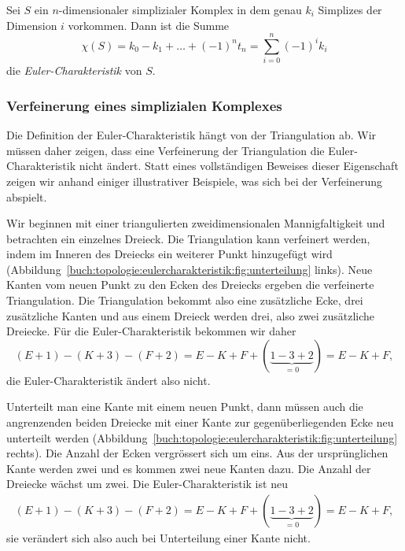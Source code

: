 \begin{definition}
Sei $S$ ein $n$-dimensionaler simplizialer Komplex in dem
genau $k_i$ Simplizes der Dimension $i$ vorkommen.
Dann ist die Summe
\[
\chi(S)
=
k_0 - k_1 + \dots + (-1)^n t_n
=
\sum_{i=0}^n (-1)^i k_i
\]
die \emph{Euler-Charakteristik} von $S$.
%
\end{definition}

%
%
\subsubsection{Verfeinerung eines simplizialen Komplexes}
Die Definition der Euler-Charakteristik hängt von der Triangulation ab.
Wir müssen daher zeigen, dass eine Verfeinerung der Triangulation die
Euler-Charakteristik nicht ändert.
Statt eines vollständigen Beweises dieser Eigenschaft zeigen wir anhand
einiger illustrativer Beispiele, was sich bei der Verfeinerung
abspielt.
%

Wir beginnen mit einer triangulierten zweidimensionalen Mannigfaltigkeit
und betrachten ein einzelnes Dreieck.
Die Triangulation kann verfeinert werden, indem im Inneren des
Dreiecks ein weiterer Punkt hinzugefügt wird
(Abbildung~\ref{buch:topologie:eulercharakteristik:fig:unterteilung} links).
Neue Kanten vom neuen Punkt zu den Ecken des Dreiecks ergeben die
verfeinerte Triangulation.
Die Triangulation bekommt also eine zusätzliche Ecke, drei zusätzliche
Kanten und aus einem Dreieck werden drei, also zwei zusätzliche Dreiecke.
Für die Euler-Charakteristik bekommen wir daher
\[
(E+1) - (K+3) - (F+2)
=
E-K+F+(\underbrace{1-3+2}_{\displaystyle=0})
=
E-K+F,
\]
die Euler-Charakteristik ändert also nicht.

Unterteilt man eine Kante mit einem neuen Punkt, dann müssen auch
die angrenzenden beiden Dreiecke mit einer Kante zur gegenüberliegenden
Ecke neu unterteilt werden
(Abbildung~\ref{buch:topologie:eulercharakteristik:fig:unterteilung} rechts).
Die Anzahl der Ecken vergrössert sich um eins.
Aus der ursprünglichen Kante werden zwei und es kommen zwei neue Kanten
dazu.
Die Anzahl der Dreiecke wächst um zwei.
Die Euler-Charakteristik ist neu
\begin{align*}
(E+1) - (K+3) - (F+2)
=
E-K+F +(\underbrace{1-3+2}_{\displaystyle=0})
=
E-K+F,
\end{align*}
sie verändert sich also auch bei Unterteilung einer Kante nicht.

